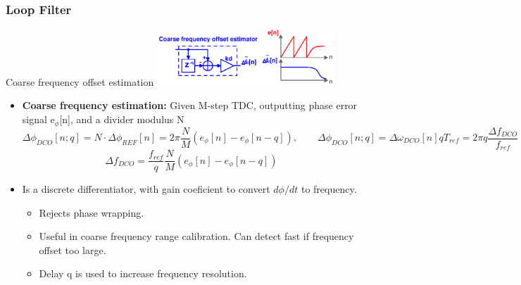 \documentclass[t, screen, aspectratio=43]{beamer}
\begin{document}
\begin{frame}
	\frametitle{Loop Filter}
	\begin{block}{Coarse frequency offset estimation}
		\vspace{-0.5em}
		\center\includegraphics[width=0.5\textwidth, angle=0]{coarse_est.pdf}
		\begin{itemize}
			\footnotesize
			\item \textbf{Coarse frequency estimation:} Given M-step TDC, outputting phase error signal e$_\phi$[n], and a divider modulus N
			\tiny
			\vspace{-1em}
			\begin{equation}
				\Delta \phi_{DCO}[n; q] = N\cdot\Delta \phi_{REF}[n] = 2\pi \frac{N}{M}\left( e_\phi[n]-e_\phi[n-q]\right ),\hspace{2em} \Delta \phi_{DCO}[n; q] = \Delta \omega_{DCO}[n]qT_{ref} = 2\pi q \frac{\Delta f_{DCO}}{f_{ref}}
			\end{equation}
			\vspace{-1em}
			\begin{equation}
				\Delta f_{DCO} = \frac{f_{ref}}{q}\frac{N}{M}\left( e_\phi[n]-e_\phi[n-q]\right )
			\end{equation}				
			\footnotesize	
			\item Is a discrete differentiator, with gain coeficient to convert $d\phi/dt$ to frequency. 
			\begin{itemize}
				\scriptsize
				\item Rejects phase wrapping.	
				\item Useful in coarse frequency range calibration. Can detect fast if frequency offset too large.
				\item Delay q is used to increase frequency resolution. 
			\end{itemize}			
		\end{itemize} 	
	\end{block}
\end{frame}
\end{document}
